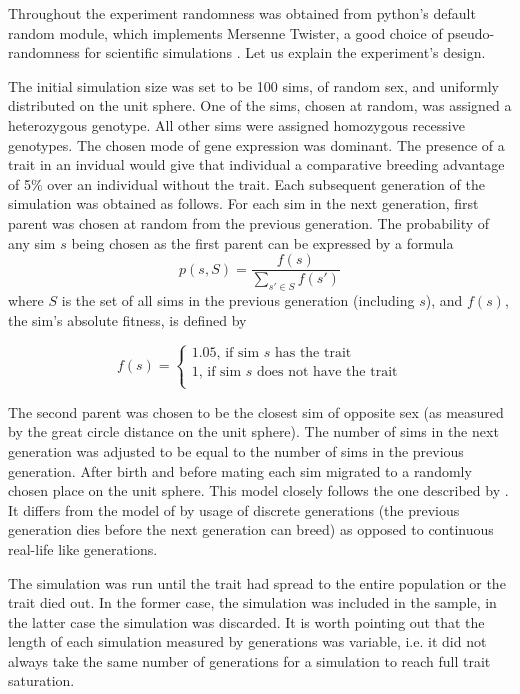 \documentclass{l4proj}
\begin{document}
Throughout the experiment randomness was obtained from python's default random module, which implements Mersenne Twister, a good choice of pseudo-randomness for scientific simulations \parencite{Matsumoto98}. Let us explain the experiment's design.

The initial simulation size was set to be 100 sims, of random sex, and uniformly distributed on the unit sphere. One of the sims, chosen at random, was assigned a \gls{heterozygous} genotype. All other sims were assigned \gls{homozygous} recessive genotypes. The chosen mode of gene expression was \gls{dominant}. The presence of a trait in an invidual would give that individual a comparative breeding advantage of 5\% over an individual without the trait. Each subsequent generation of the simulation was obtained as follows. For each sim in the next generation, first parent was chosen at random from the previous generation. The probability of any sim $s$ being chosen as the first parent can be expressed by a formula
$$p(s, S) = \frac{f(s)}{\sum_{s' \in S}^{}f(s')}$$
where $S$ is the set of all sims in the previous generation (including $s$), and $f(s)$, the sim's absolute fitness, is defined by

$$
f(s) = \begin{cases}
  1.05 \text{, if sim $s$ has the trait} \\
  1 \text{, if sim $s$ does not have the trait} \\
\end{cases}
$$

The second parent was chosen to be the closest sim of opposite sex (as measured by the great circle distance on the unit sphere). The number of sims in the next generation was adjusted to be equal to the number of sims in the previous generation. After birth and before mating each sim migrated to a randomly chosen place on the unit sphere. This model closely follows the one described by \cite{peng10}. It differs from the model of \cite{rohde04} by usage of discrete generations (the previous generation dies before the next generation can breed) as opposed to continuous real-life like generations.

The simulation was run until the trait had spread to the entire population or the trait died out. In the former case, the simulation was included in the sample, in the latter case the simulation was discarded. It is worth pointing out that the length of each simulation measured by generations was variable, i.e. it did not always take the same number of generations for a simulation to reach full trait saturation.
\end{document}
